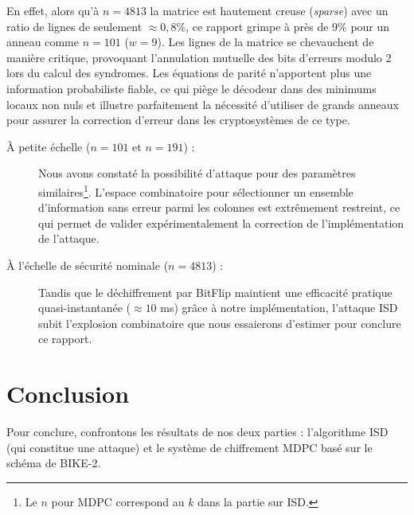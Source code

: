 \documentclass[11pt,a4paper]{article}
\begin{document}
En effet, alors qu'à $n = 4813$ la matrice est hautement creuse
(\textit{sparse}) avec un ratio de lignes de seulement $\approx 0{,}8\%$, ce
rapport grimpe à près de $9\%$ pour un anneau comme $n = 101$ ($w = 9$). Les
lignes de la matrice se chevauchent de manière critique, provoquant l'annulation
mutuelle des bits d'erreurs modulo 2 lors du calcul des syndromes. Les équations
de parité n'apportent plus une information probabiliste fiable, ce qui piège le
décodeur dans des minimums locaux non nuls et illustre parfaitement la nécessité
d'utiliser de grands anneaux pour assurer la correction d'erreur dans les
cryptosystèmes de ce type.
\begin{description}
    \item[À petite échelle ($n=101$ et $n=191$) :] Nous avons constaté la
    possibilité d'attaque pour des paramètres similaires\footnote{Le $n$ pour
    MDPC correspond au $k$ dans la partie sur ISD.}. L'espace combinatoire pour
    sélectionner un ensemble d'information sans erreur parmi les colonnes est
    extrêmement restreint, ce qui permet de valider expérimentalement la
    correction de l'implémentation de l'attaque.
    \item[À l'échelle de sécurité nominale ($n=4813$) :] Tandis que le
    déchiffrement par BitFlip maintient une efficacité pratique
    quasi-instantanée ($\approx 10$ ms) grâce à notre implémentation, l'attaque
    ISD subit l'explosion combinatoire que nous essaierons d'estimer pour
    conclure ce rapport.
\end{description}


\section{Conclusion}

Pour conclure, confrontons les résultats de nos deux parties : l'algorithme ISD
(qui constitue une attaque) et le système de chiffrement MDPC basé sur le schéma
de BIKE-2.
\end{document}
